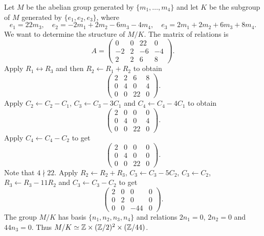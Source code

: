 \begin{example}
Let $M$ be the abelian group generated by $\{m_1,\dots,m_4\}$ and let $K$
be the subgroup of $M$ generated by 
$\{e_1,e_2,e_3\}$, where 
\[
e_1=22m_3,\quad
e_2=-2m_1+2m_2-6m_3-4m_4,\quad
e_3=2m_1+2m_2+6m_3+8m_4.
\]
We want to determine the structure of $M/K$. 
The matrix of relations is  
\[
A=\begin{pmatrix}
	0 & 0 & 22 & 0\\
	-2 & 2 & -6 & -4\\
	2 & 2 & 6 & 8
\end{pmatrix}.
\]
Apply $R_1\leftrightarrow R_3$ and then $R_2\leftarrow R_1+R_2$ to obtain 
\[
\begin{pmatrix}
	2 & 2 & 6 & 8\\
	0 & 4 & 0 & 4\\
	0 & 0 & 22 & 0
\end{pmatrix}.
\]
Apply $C_2\leftarrow C_2-C_1$, $C_3\leftarrow C_3-3C_1$ and
$C_4\leftarrow C_4-4C_1$ to obtain 
\[
\begin{pmatrix}
	2 & 0 & 0 & 0\\
	0 & 4 & 0 & 4\\
	0 & 0 & 22 & 0
\end{pmatrix}.
\]
Apply $C_4\leftarrow C_4-C_2$ to get 
\[
\begin{pmatrix}
	2 & 0 & 0 & 0\\
	0 & 4 & 0 & 0\\
	0 & 0 & 22 & 0
\end{pmatrix}. 
\]
Note that $4\nmid 22$. Apply $R_2\leftarrow R_2+R_3$, $C_3\leftarrow C_3-5C_2$, $C_3\leftarrow C_2$, $R_3\leftarrow R_3-11R_2$ and 
$C_3\leftarrow C_3-C_2$ to get 
\[
\begin{pmatrix}
	2 & 0 & 0 & 0\\
	0 & 2 & 0 & 0\\
	0 & 0 & -44 & 0
\end{pmatrix}.
\]
The group $M/K$ has basis $\{n_1,n_2,n_3,n_4\}$ and relations 
$2n_1=0$, $2n_2=0$ and $44n_3=0$. Thus $M/K\simeq\mathbb{Z}\times (\mathbb{Z}/2)^2\times (\mathbb{Z}/44)$. 
\end{example}

